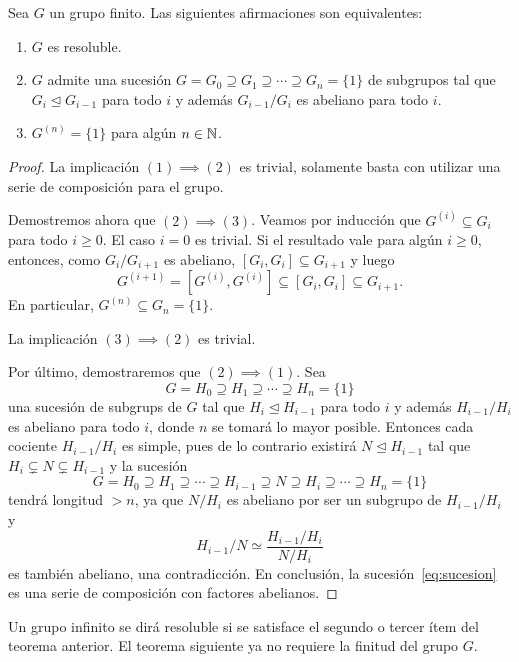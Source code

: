 \begin{theorem}
Sea $G$ un grupo finito. Las siguientes afirmaciones son equivalentes:
\begin{enumerate}
	\item $G$ es resoluble.
	\item $G$ admite una sucesión $G=G_0\supseteq G_1\supseteq\cdots\supseteq G_n=\{1\}$ de subgrupos tal que $G_i\unlhd G_{i-1}$ para todo $i$ y además $G_{i-1}/G_i$ es abeliano para todo $i$. 
	\item $G^{(n)}=\{1\}$ para algún $n\in\mathbb{N}$. 
\end{enumerate}	
\end{theorem}

\begin{proof}
	La implicación $(1)\implies(2)$ es trivial, solamente basta con utilizar una serie de composición para el grupo.
	
	Demostremos ahora que $(2)\implies(3)$. Veamos por inducción que $G^{(i)}\subseteq G_i$ para todo $i\geq0$. El caso $i=0$ es trivial. Si el resultado
	vale para algún $i\geq0$, entonces, como $G_i/G_{i+1}$ es abeliano, $[G_i,G_i]\subseteq G_{i+1}$ y luego
	\[
	G^{(i+1)}=[G^{(i)},G^{(i)}]\subseteq [G_i,G_i]\subseteq G_{i+1}.
	\]
	En particular, $G^{(n)}\subseteq G_n=\{1\}$.   
	
	La implicación $(3)\implies(2)$ es trivial.
	
	Por último, demostraremos que $(2)\implies(1)$. Sea 
	\begin{equation}
	\label{eq:sucesion}
		G=H_0\supseteq H_1\supseteq\cdots\supseteq H_n=\{1\}		
	\end{equation}
	una sucesión de subgrups de $G$ tal que
	$H_i\unlhd H_{i-1}$ para todo $i$ y además $H_{i-1}/H_i$ es abeliano para todo $i$, donde $n$ se tomará lo mayor posible. Entonces cada
	cociente $H_{i-1}/H_i$ es simple, pues de lo contrario existirá $N\unlhd H_{i-1}$ tal que $H_i\subsetneq N\subsetneq H_{i-1}$ 
	y la sucesión
	\[
	G=H_0\supseteq H_1\supseteq\cdots\supseteq H_{i-1}\supseteq N\supseteq H_i\supseteq\cdots\supseteq H_n=\{1\}
	\]
	tendrá longitud $>n$, ya que $N/H_i$ es abeliano por ser un subgrupo de $H_{i-1}/H_i$ y 
	\[
	H_{i-1}/N\simeq \frac{H_{i-1}/H_i}{N/H_i}
	\]
	es también abeliano,
	una contradicción. En conclusión, la sucesión~\eqref{eq:sucesion} es una serie de composición con factores abelianos. 
\end{proof}

Un grupo infinito se dirá resoluble si se satisface el segundo o tercer ítem del teorema anterior. El teorema siguiente ya no requiere la finitud del grupo $G$.

